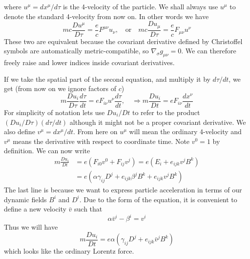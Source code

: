 where $u^{\mu} = dx^{\mu}/d\tau$ is the 4-velocity of the particle. We shall
always use $u^{\mu}$ to denote the standard 4-velocity from now on. In other
words we have
\begin{equation}
  \label{eq:24}
  mc\frac{Du^{\mu}}{D\tau} = \frac{e}{c}F^{\mu\nu}u_{\nu}, \quad \text{or} \quad mc\frac{D u_{\mu}}{D\tau} = \frac{e}{c}F_{\mu\nu}u^{\nu}
\end{equation}
These two are equivalent because the covariant derivative defined by Christoffel
symbols are automatically metric-compatible, so $\nabla_{\sigma}g_{\mu\nu} = 0$.
We can therefore freely raise and lower indices inside covariant derivatives.

If we take the spatial part of the second equation, and multiply it by
$d\tau/dt$, we get (from now on we ignore factors of $c$)
\begin{equation}
  \label{eq:25}
  m\frac{Du_i}{D\tau}\frac{d\tau}{dt} = eF_{i\nu}u^{\nu}\frac{d\tau}{dt},\quad \Longrightarrow m\frac{Du_i}{Dt} = eF_{i\nu}\frac{dx^{\nu}}{dt}
\end{equation}
For simplicity of notation lets use $Du_i/Dt$ to refer to the product
$(Du_i/D\tau)(d\tau/dt)$ although it might not be a proper covariant derivative.
We also define $v^{\mu} = dx^{\mu}/dt$. From here on $u^{\mu}$ will mean the
ordinary 4-velocity and $v^{\mu}$ means the derivative with respect to
coordinate time. Note $v^0 = 1$ by definition. We can now write
\begin{equation}
  \label{eq:26}
  \begin{split}
  m\frac{Du_i}{Dt} &= e(F_{i0}v^0 + F_{ij}v^j) = e(E_i + e_{ijk}v^jB^k) \\
                   &= e \left( \alpha \gamma_{ij}D^j + e_{ijk}\beta^jB^k + e_{ijk}v^jB^k \right)
  \end{split}
\end{equation}
The last line is because we want to express particle acceleration in terms of
our dynamic fields $B^i$ and $D^{i}$. Due to the form of the equation, it is
convenient to define a new velocity $\bar{v}$ such that
\begin{equation}
  \label{eq:27}
  \alpha \bar{v}^{i} - \beta^i = v^i
\end{equation}
Thus we will have
\begin{equation}
  \label{eq:28}
  m\frac{Du_i}{Dt} = e\alpha(\gamma_{ij}D^j + e_{ijk}\bar{v}^jB^k)
\end{equation}
which looks like the ordinary Lorentz force.

